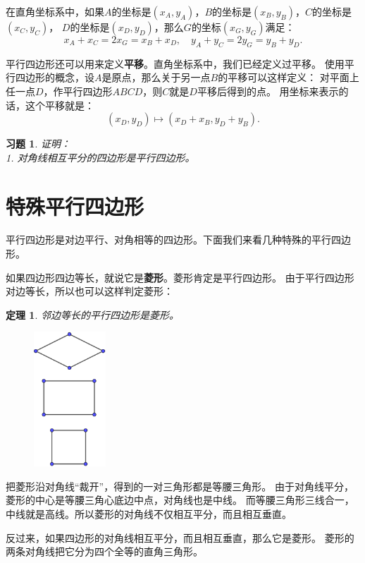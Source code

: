 \documentclass[12pt,UTF8]{ctexbook}
\newtheorem{tm}{定理}[section]
\newtheorem{xt}{习题}[section]
\begin{document}
在直角坐标系中，如果$A$的坐标是$(x_A, y_A)$，$B$的坐标是$(x_B, y_B)$，$C$的坐标是$(x_C, y_C)$，
$D$的坐标是$(x_D, y_D)$，那么$G$的坐标$(x_G, y_G)$满足：
$$ x_A + x_C = 2 x_G = x_B + x_D, \quad y_A + y_C = 2 y_G = y_B + y_D. $$

平行四边形还可以用来定义\textbf{平移}。直角坐标系中，我们已经定义过平移。
使用平行四边形的概念，设$A$是原点，那么关于另一点$B$的平移可以这样定义：
对平面上任一点$D$，作平行四边形$ABCD$，则$C$就是$D$平移后得到的点。
用坐标来表示的话，这个平移就是：
$$ (x_D, y_D) \mapsto (x_D + x_B, y_D + y_B).$$

\begin{xt}\label{xt:0-0-0}
    证明：\\
    1. 对角线相互平分的四边形是平行四边形。
\end{xt}

\section{特殊平行四边形}
平行四边形是对边平行、对角相等的四边形。下面我们来看几种特殊的平行四边形。

如果四边形四边等长，就说它是\textbf{菱形}。菱形肯定是平行四边形。
由于平行四边形对边等长，所以也可以这样判定菱形：
\begin{tm}\label{tm:0-1-0}
    邻边等长的平行四边形是菱形。
\end{tm}

\begin{figure} %
    \centering
    \includegraphics[width=0.24\textwidth]{特殊平行四边形.png}
\end{figure}

把菱形沿对角线“裁开”，得到的一对三角形都是等腰三角形。
由于对角线平分，菱形的中心是等腰三角心底边中点，对角线也是中线。
而等腰三角形三线合一，中线就是高线。所以菱形的对角线不仅相互平分，而且相互垂直。

反过来，如果四边形的对角线相互平分，而且相互垂直，那么它是菱形。
菱形的两条对角线把它分为四个全等的直角三角形。
\end{document}
